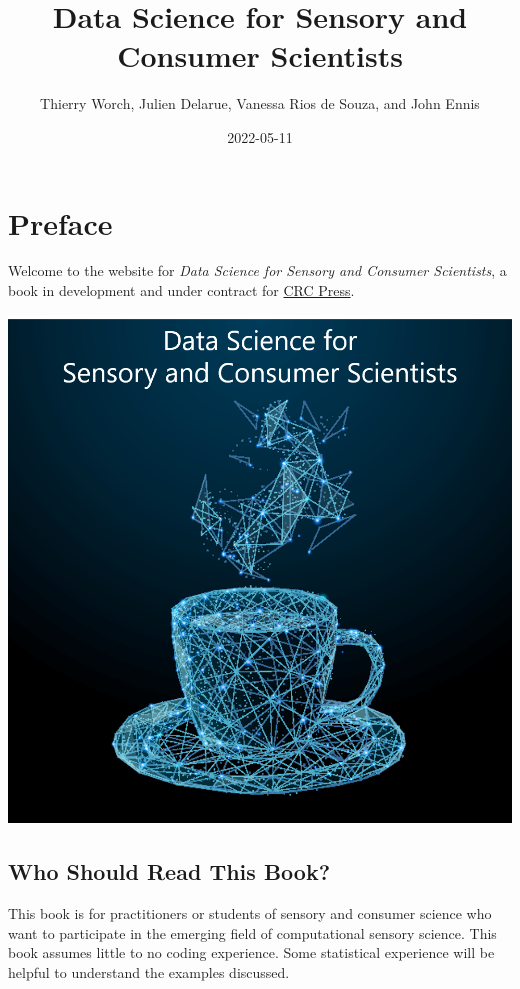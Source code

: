 \documentclass[
]{book}
\title{Data Science for Sensory and Consumer Scientists}
\author{Thierry Worch, Julien Delarue, Vanessa Rios de Souza, and John Ennis}
\date{2022-05-11}
\begin{document}
\maketitle

{
\setcounter{tocdepth}{1}
\tableofcontents
}
\hypertarget{preface}{%
\chapter*{Preface}\label{preface}}

Welcome to the website for \emph{Data Science for Sensory and Consumer Scientists}, a book in development and under contract for \href{https://www.routledge.com/}{CRC Press}.

\begin{center}\includegraphics[width=13.44in]{images/cover_art} \end{center}

\hypertarget{who-should-read-this-book}{%
\section*{Who Should Read This Book?}\label{who-should-read-this-book}}

This book is for practitioners or students of sensory and consumer science who want to participate in the emerging field of computational sensory science. This book assumes little to no coding experience. Some statistical experience will be helpful to understand the examples discussed.
\end{document}
